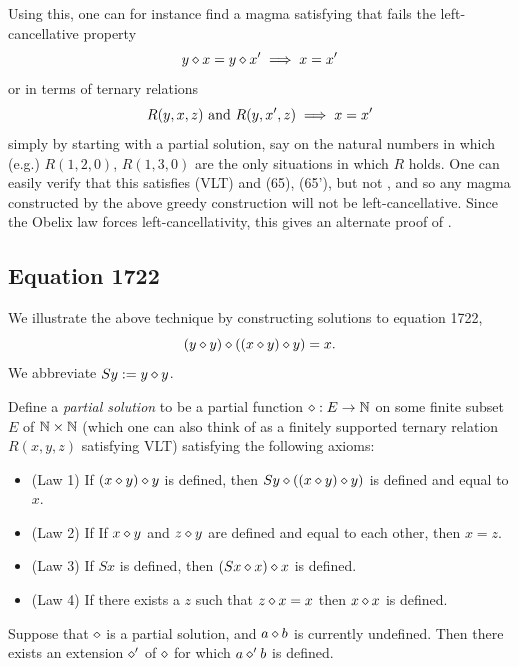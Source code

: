 Using this, one can for instance find a magma satisfying  that fails the left-cancellative property
$$ y \diamond x = y \diamond x' \implies x=x'$$
or in terms of ternary relations
\begin{equation}\label{left-inject}
   R(y,x,z) \hbox{ and } R(y,x',z) \implies x=x'
\end{equation}
simply by starting with a partial solution, say on the natural numbers in which (e.g.) $R(1,2,0)$, $R(1,3,0)$ are the only situations in which $R$ holds.  One can easily verify that this satisfies (VLT) and (65), (65'), but not , and so any magma constructed by the above greedy construction will not be left-cancellative.  Since the Obelix law  forces left-cancellativity, this gives an alternate proof of .

\subsection{Equation 1722}

We illustrate the above technique by constructing solutions to equation 1722,
\begin{equation}\label{1722}
  (y \diamond y) \diamond ((x \diamond y) \diamond y) = x.
\end{equation}
We abbreviate $Sy := y \diamond y$.

Define a \emph{partial solution} to be a partial function $\diamond: E \to \mathbb{N}$ on some finite subset $E$ of $\mathbb{N} \times \mathbb{N}$ (which one can also think of as a finitely supported ternary relation $R(x,y,z)$ satisfying VLT) satisfying the following axioms:
\begin{itemize}
\item (Law 1) If $(x \diamond y) \diamond y$ is defined, then $Sy \diamond ((x \diamond y) \diamond y)$ is defined and equal to $x$.
\item (Law 2) If  If $x \diamond y$ and $z \diamond y$ are defined and equal to each other, then $x=z$.
\item (Law 3) If $Sx$ is defined, then $(Sx \diamond x) \diamond x$ is defined.
\item (Law 4) If there exists a $z$ such that $z \diamond x = x$ then $x \diamond x$ is defined.
\end{itemize}

\begin{lemma}[1722 extension]\label{1722-extension}\leanok{}  Suppose that $\diamond$ is a partial solution, and $a \diamond b$ is currently undefined.  Then there exists an extension $\diamond'$ of $\diamond$ for which $a \diamond' b$ is defined.
\end{lemma}

